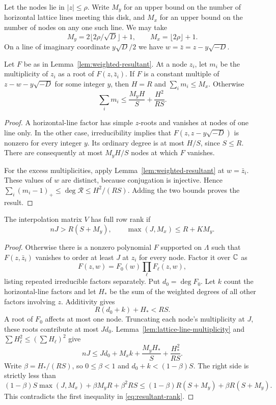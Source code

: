 Let the nodes lie in $|z|\leq\rho$. Write $M_y$ for an upper bound
on the number of horizontal lattice lines meeting this disk, and $M_x$
for an upper bound on the number of nodes on any one such line. We may take
\[
 M_y=2\lfloor2\rho/\sqrt D\rfloor+1,
 \qquad M_x=\lfloor2\rho\rfloor+1.
\]
On a line of imaginary coordinate $y\sqrt D/2$ we have
$w=\bar z=z-y\sqrt{-D}$.

\begin{lemma}\label{lem:lattice-line-multiplicity}
Let $F$ be as in Lemma~\ref{lem:weighted-resultant}. At a node $z_i$,
let $m_i$ be the multiplicity of $z_i$ as a root of $F(z,\bar z_i)$.
If $F$ is a constant multiple of $z-w-y\sqrt{-D}$ for some integer $y$,
then $H=R$ and $\sum_i m_i\leq M_x$. Otherwise
\[
 \sum_i m_i\leq\frac{M_yH}{S}+\frac{H^2}{RS}.
\]
\end{lemma}
\begin{proof}
A horizontal-line factor has simple $z$-roots and vanishes at nodes of
one line only. In the other case, irreducibility implies that
$F(z,z-y\sqrt{-D})$ is nonzero for every integer $y$.
Its ordinary degree is at most $H/S$, since $S\leq R$.
There are consequently at most $M_yH/S$ nodes at which $F$ vanishes.

For the excess multiplicities, apply Lemma~\ref{lem:weighted-resultant}
at $w=\bar z_i$. These values of $w$ are distinct, because conjugation
is injective. Hence $\sum_i(m_i-1)_+\leq\deg\mathcal R\leq H^2/(RS)$.
Adding the two bounds proves the result.
\end{proof}

\begin{proposition}\label{prop:resultant-rank}
The interpolation matrix $V$ has full row rank if
\begin{equation}\label{eq:resultant-rank}
 nJ>R(S+M_y),\qquad \max(J,M_x)\leq R+KM_y.
\end{equation}
\end{proposition}
\begin{proof}
Otherwise there is a nonzero polynomial $F$ supported on $\Lambda$
such that $F(z,\bar z_i)$ vanishes to order at least $J$ at $z_i$ for
every node. Factor it over $\mathbb C$ as
\[
 F(z,w)=F_0(w)\prod_\ell F_\ell(z,w),
\]
listing repeated irreducible factors separately. Put $d_0=\deg F_0$.
Let $k$ count the horizontal-line factors and let $H_*$ be the sum of
the weighted degrees of all other factors involving $z$. Additivity gives
\[
 R(d_0+k)+H_*<RS.
\]
A root of $F_0$ affects at most one node. Truncating each node's
multiplicity at $J$, these roots contribute at most $Jd_0$.
Lemma~\ref{lem:lattice-line-multiplicity} and
$\sum H_\ell^2\leq(\sum H_\ell)^2$ give
\[
 nJ\leq Jd_0+M_xk+\frac{M_yH_*}{S}+\frac{H_*^2}{RS}.
\]
Write $\beta=H_*/(RS)$, so $0\leq\beta<1$ and
$d_0+k<(1-\beta)S$. The right side is strictly less than
\[
 (1-\beta)S\max(J,M_x)+\beta M_yR+\beta^2RS
 \leq(1-\beta)R(S+M_y)+\beta R(S+M_y).
\]
This contradicts the first inequality in \eqref{eq:resultant-rank}.
\end{proof}
